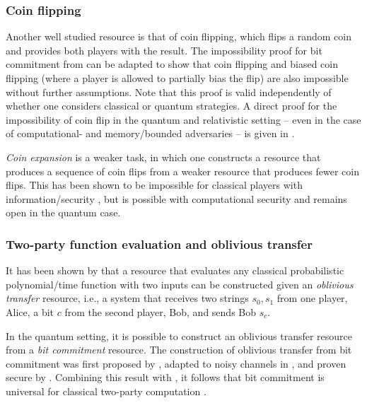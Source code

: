 \subsubsection{Coin flipping}
\label{sec:mpc.CF}

Another well studied resource is that of coin flipping, which flips a
random coin and provides both players with the result. The
impossibility proof for bit commitment from \textcite{MR11} can be
adapted to show that coin flipping and biased coin flipping (where a
player is allowed to partially bias the flip) are also impossible
without further assumptions.  Note that this proof is valid
independently of whether one considers classical or quantum
strategies. A direct proof for the impossibility of coin flip in the
quantum and relativistic setting \--- even in the case of
computational- and memory\-/bounded adversaries \--- is given in
\textcite{VPdR19}.

\emph{Coin expansion} is a weaker task, in which one constructs a
resource that produces a sequence of coin flips from a weaker resource
that produces fewer coin flips. This has been shown to be impossible
for classical players with information\-/security \cite{HMU06,SM16},
but is possible with computational security \cite{HMU06} and remains
open in the quantum case.



\subsubsection{Two-party function evaluation and oblivious transfer}
\label{sec:mpc.OT}

It has been shown by \textcite{IPS08} that a resource that evaluates
any classical probabilistic polynomial\-/time function with two inputs
can be constructed given an \emph{oblivious transfer} resource, i.e.,
a system that receives two strings $s_0,s_1$ from one player, Alice, a
bit $c$ from the second player, Bob, and sends Bob $s_c$.

In the quantum setting, it is possible to construct an oblivious
transfer resource from a \emph{bit commitment} resource. The
construction of oblivious transfer from bit commitment was first
proposed by \textcite{CK88}, adapted to noisy channels in
\textcite{BBCS92}, and proven secure by \textcite{Unr10}. Combining
this result with \textcite{IPS08}, it follows that bit commitment is
universal for classical two-party computation \cite{Unr10}.

